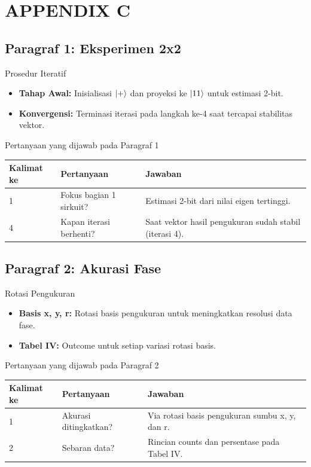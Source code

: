 \section{APPENDIX C}

\subsection{Paragraf 1: Eksperimen 2x2}
\begin{frame}{Prosedur Iteratif}
    \begin{itemize}
        \item \textbf{Tahap Awal:} Inisialisasi $\ket{+}$ dan proyeksi ke $\ket{11}$ untuk estimasi 2-bit.
        \item \textbf{Konvergensi:} Terminasi iterasi pada langkah ke-4 saat tercapai stabilitas vektor.
    \end{itemize}
\end{frame}

\begin{frame}{Pertanyaan yang dijawab pada Paragraf 1}
    \centering
    \small
    \begin{tabular}{lp{4.5cm}p{6cm}}
        \toprule
        Kalimat ke & Pertanyaan & Jawaban \\
        \midrule
        1 & Fokus bagian 1 sirkuit? & Estimasi 2-bit dari nilai eigen tertinggi. \\
        4 & Kapan iterasi berhenti? & Saat vektor hasil pengukuran sudah stabil (iterasi 4). \\
        \bottomrule
    \end{tabular}
\end{frame}

\subsection{Paragraf 2: Akurasi Fase}
\begin{frame}{Rotasi Pengukuran}
    \begin{itemize}
        \item \textbf{Basis x, y, r:} Rotasi basis pengukuran untuk meningkatkan resolusi data fase.
        \item \textbf{Tabel IV:} Outcome untuk setiap variasi rotasi basis.
    \end{itemize}
\end{frame}

\begin{frame}{Pertanyaan yang dijawab pada Paragraf 2}
    \centering
    \small
    \begin{tabular}{lp{4.5cm}p{6cm}}
        \toprule
        Kalimat ke & Pertanyaan & Jawaban \\
        \midrule
        1 & Akurasi ditingkatkan? & Via rotasi basis pengukuran sumbu x, y, dan r. \\
        2 & Sebaran data? & Rincian counts dan persentase pada Tabel IV. \\
        \bottomrule
    \end{tabular}
\end{frame}

